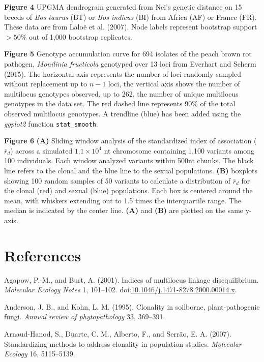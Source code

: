 \documentclass{frontiersSCNS} %
\begin{document}
\textbf{Figure 4} UPGMA dendrogram generated from Nei's genetic distance
on 15 breeds of \emph{Bos taurus} (BT) or \emph{Bos indicus} (BI) from
Africa (AF) or France (FR). These data are from Lalo{ë} et al. (2007).
Node labels represent bootstrap support \(>50\%\) out of 1,000 bootstrap
replicates.

\textbf{Figure 5} Genotype accumulation curve for 694 isolates of the
peach brown rot pathogen, \emph{Monilinia fructicola} genotyped over 13
loci from Everhart and Scherm (2015). The horizontal axis represents the
number of loci randomly sampled without replacement up to \(n - 1\)
loci, the vertical axis shows the number of multilocus genotypes
observed, up to 262, the number of unique multilocus genotypes in the
data set. The red dashed line represents 90\% of the total observed
multilocus genotypes. A trendline (blue) has been added using the
\emph{ggplot2} function \texttt{stat\_smooth}.

\textbf{Figure 6} \textbf{(A)} Sliding window analysis of the
standardized index of association (\(\bar{r}_d\)) across a simulated
\(1.1 \times 10^4\) nt chromosome containing 1,100 variants among 100
individuals. Each window analyzed variants within 500nt chunks. The
black line refers to the clonal and the blue line to the sexual
populations. \textbf{(B)} boxplots showing 100 random samples of 50
variants to calculate a distribution of \(\bar{r}_d\) for the clonal
(red) and sexual (blue) populations. Each box is centered around the
mean, with whiskers extending out to 1.5 times the interquartile range.
The median is indicated by the center line. \textbf{(A)} and
\textbf{(B)} are plotted on the same y-axis.

\section*{References}\label{references}

Agapow, P.-M., and Burt, A. (2001). Indices of multilocus linkage
disequilibrium. \emph{Molecular Ecology Notes} 1, 101--102.
doi:\href{http://dx.doi.org/10.1046/j.1471-8278.2000.00014.x}{10.1046/j.1471-8278.2000.00014.x}.

Anderson, J. B., and Kohn, L. M. (1995). Clonality in soilborne,
plant-pathogenic fungi. \emph{Annual review of phytopathology} 33,
369--391.

Arnaud-Hanod, S., Duarte, C. M., Alberto, F., and Serr{ã}o, E. A.
(2007). Standardizing methods to address clonality in population
studies. \emph{Molecular Ecology} 16, 5115--5139.
\end{document}
